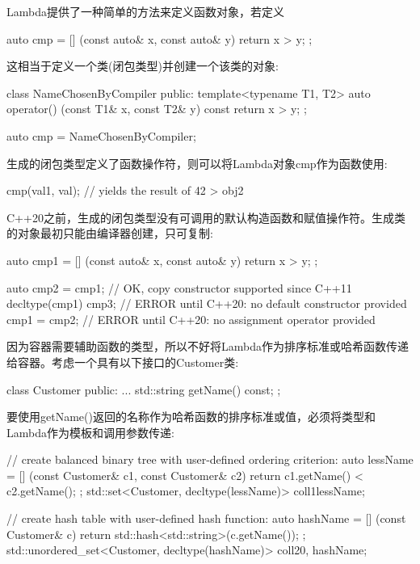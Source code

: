 Lambda提供了一种简单的方法来定义函数对象，若定义

\begin{cpp}
auto cmp = [] (const auto& x, const auto& y) {
				return x > y;
			};
\end{cpp}

这相当于定义一个类(闭包类型)并创建一个该类的对象:

\begin{cpp}
class NameChosenByCompiler {
	public:
	template<typename T1, T2>
	auto operator() (const T1& x, const T2& y) const {
		return x > y;
	}
};

auto cmp = NameChosenByCompiler{};
\end{cpp}

生成的闭包类型定义了函数操作符，则可以将Lambda对象cmp作为函数使用:

\begin{cpp}
cmp(val1, val); // yields the result of 42 > obj2
\end{cpp}

C++20之前，生成的闭包类型没有可调用的默认构造函数和赋值操作符。生成类的对象最初只能由编译器创建，只可复制:

\begin{cpp}
auto cmp1 = [] (const auto& x, const auto& y) {
				return x > y;
			};

auto cmp2 = cmp1; // OK, copy constructor supported since C++11
decltype(cmp1) cmp3; // ERROR until C++20: no default constructor provided
cmp1 = cmp2; // ERROR until C++20: no assignment operator provided
\end{cpp}

因为容器需要辅助函数的类型，所以不好将Lambda作为排序标准或哈希函数传递给容器。考虑一个具有以下接口的Customer类:

\begin{cpp}
class Customer
{
	public:
	...
	std::string getName() const;
};
\end{cpp}

要使用getName()返回的名称作为哈希函数的排序标准或值，必须将类型和Lambda作为模板和调用参数传递:

\begin{cpp}
// create balanced binary tree with user-defined ordering criterion:
auto lessName = [] (const Customer& c1, const Customer& c2) {
	return c1.getName() < c2.getName();
};
std::set<Customer, decltype(lessName)> coll1{lessName};

// create hash table with user-defined hash function:
auto hashName = [] (const Customer& c) {
	return std::hash<std::string>{}(c.getName());
};
std::unordered_set<Customer, decltype(hashName)> coll2{0, hashName};
\end{cpp}

